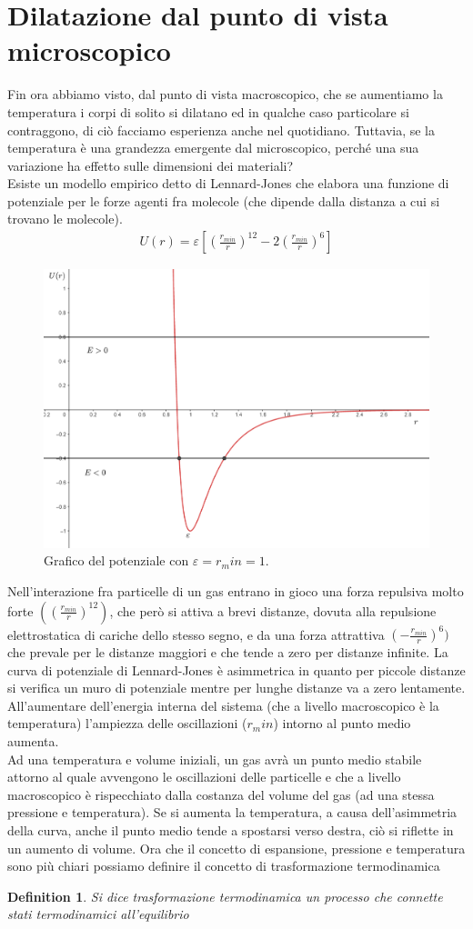 \documentclass[10pt,a4paper]{article}
\newtheorem{definition}{Definition}
\begin{document}
\section{Dilatazione dal punto di vista microscopico}
Fin ora abbiamo visto, dal punto di vista macroscopico, che se aumentiamo la temperatura i corpi di solito si dilatano ed in qualche caso particolare si contraggono, di ciò facciamo esperienza anche nel quotidiano. Tuttavia, se la temperatura è una grandezza emergente dal microscopico, perché una sua variazione ha effetto sulle dimensioni dei materiali?\\
Esiste un modello empirico detto di Lennard-Jones che elabora una funzione di potenziale per le forze agenti fra molecole (che dipende dalla distanza a cui si trovano le molecole). 
\begin{align*} 
	U(r) = \varepsilon[(\frac{r_{min}}{r})^{12}-2(\frac{r_{min}}{r})^6]
\end{align*} 
\begin{figure}[h!]
	\centering
	\includegraphics[width=0.6\linewidth]{../images/../images/Lennard-Jones_model}
	\caption{Grafico del potenziale con $\varepsilon =r_min = 1$.}
	\label{fig:lennard-jonesmodel}
\end{figure}
\FloatBarrier
Nell'interazione fra particelle di un gas entrano in gioco una forza repulsiva molto forte $((\frac{r_{min}}{r})^{12})$, che però si attiva a brevi distanze, dovuta alla repulsione elettrostatica di cariche dello stesso segno, e da una forza attrattiva $(-\frac{r_{min}}{r})^6)$ che prevale per le distanze maggiori e che tende a zero per distanze infinite. La curva di potenziale di Lennard-Jones è asimmetrica in quanto per piccole distanze si verifica un muro di potenziale mentre per lunghe distanze va a zero lentamente. All'aumentare dell'energia interna del sistema (che a livello macroscopico è la temperatura) l'ampiezza delle oscillazioni ($r_min$) intorno al punto medio aumenta.\\
Ad una temperatura e volume iniziali, un gas avrà un punto medio stabile attorno al quale avvengono le oscillazioni delle particelle e che a livello macroscopico è rispecchiato dalla costanza del volume del gas (ad una stessa pressione e temperatura). Se si aumenta la temperatura, a causa dell'asimmetria della curva, anche il punto medio tende a spostarsi verso destra, ciò si riflette in un aumento di volume. Ora che il concetto di espansione, pressione e temperatura sono più chiari possiamo definire il concetto di trasformazione termodinamica
\begin{definition}
	Si dice trasformazione termodinamica un processo che connette stati termodinamici all'equilibrio
\end{definition}
\end{document}
